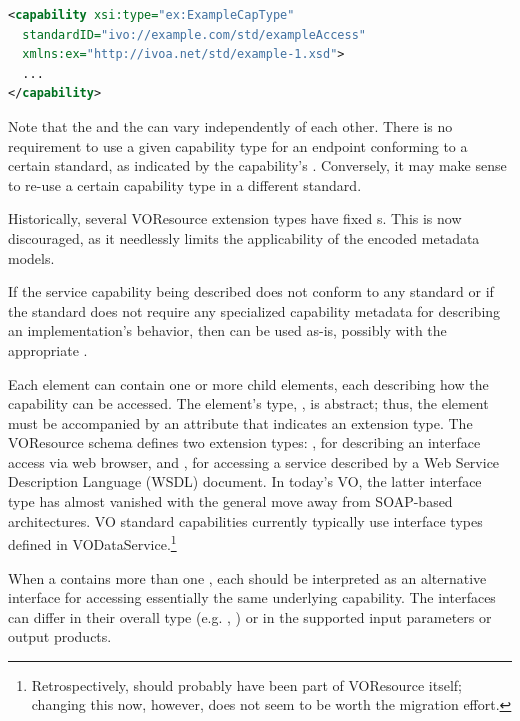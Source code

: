 \documentclass[11pt,a4paper]{ivoa}
\begin{document}
\begin{lstlisting}[language=XML]
<capability xsi:type="ex:ExampleCapType"
  standardID="ivo://example.com/std/exampleAccess"
  xmlns:ex="http://ivoa.net/std/example-1.xsd">
  ...
</capability>
\end{lstlisting}

Note that the  and the  can vary
independently of each other.  There is no requirement to use a given
capability type for an endpoint conforming to a certain standard, as
indicated by the capability's . Conversely,
it may make sense to re-use a certain capability type in a different
standard. 

Historically, several VOResource extension types have
fixed s.  This is now discouraged, as it needlessly
limits the applicability of the encoded metadata models.

If the service capability being described does not conform to any
standard or if the standard does not require any specialized
capability metadata for describing an implementation's behavior, then
 can be used as-is, possibly with the appropriate
.


Each  element can contain one or more child
 elements, each describing how the capability
can be accessed.  The  element's type,
, is abstract; thus, the
 element must be accompanied by an
 attribute that indicates an
 extension type.  The VOResource schema
defines two  extension types:
, for describing an interface access via web
browser, and , for accessing a service
described by a Web Service Description Language (WSDL) document.  In
today's VO, the latter interface type has almost vanished with the
general move away from SOAP-based architectures.  VO standard
capabilities currently typically use interface types defined in
VODataService.\footnote{Retrospectively,  should probably
have been part of VOResource itself; changing this now, however, does
not seem to be worth the migration effort.}

When a  contains more than one
, each  should be
interpreted as an alternative interface for accessing essentially the
same underlying capability.  The interfaces can differ in their
overall type (e.g. ,
) or in the supported input parameters or
output products.  
\end{document}
